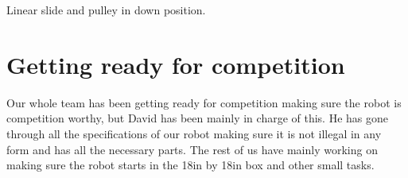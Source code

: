 Linear slide and pulley in down position.

\section*{Getting ready for competition}
Our whole team has been getting ready for competition making sure the robot is competition worthy, but David has been mainly in charge of this. He has gone through all the specifications of our robot making sure it is not illegal in any form and has all the necessary parts. The rest of us have mainly working on making sure the robot starts in the 18in by 18in box and other small tasks.
